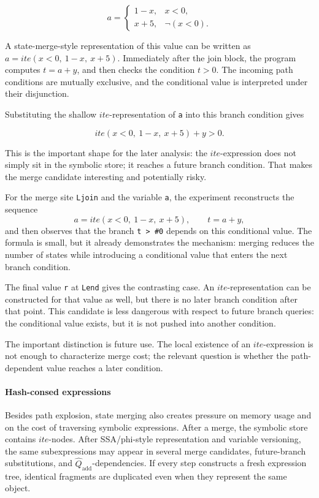 \documentclass[conference]{IEEEtran}
\newcommand{\ite}{\mathit{ite}}
\begin{document}
\[
a =
\begin{cases}
1 - x, & x < 0,\\
x + 5, & \lnot(x < 0).
\end{cases}
\]

A state-merge-style representation of this value can be written as
\(a = \ite(x < 0,\ 1 - x,\ x + 5)\). Immediately after the join block,
the program computes \(t = a + y\), and then checks the condition \(t > 0\).
The incoming path conditions are mutually exclusive, and the conditional value
is interpreted under their disjunction.

Substituting the shallow \(\ite\)-representation of \texttt{a} into this branch
condition gives

\[
\ite(x < 0,\ 1 - x,\ x + 5) + y > 0.
\]

This is the important shape for the later analysis: the \(\ite\)-expression
does not simply sit in the symbolic store; it reaches a future branch condition.
That makes the merge candidate interesting and potentially risky.

For the merge site \texttt{Ljoin} and the variable \texttt{a}, the experiment
reconstructs the sequence
\[
  a = \ite(x < 0,\ 1-x,\ x+5), \qquad t = a + y,
\]
and then observes that the branch \texttt{t > \#0} depends on this conditional
value. The formula is small, but it already demonstrates the mechanism:
merging reduces the number of states while introducing a conditional value that
enters the next branch condition.

The final value \texttt{r} at \texttt{Lend} gives the contrasting case. An
\(\ite\)-representation can be constructed for that value as well, but there is
no later branch condition after that point. This candidate is less dangerous
with respect to future branch queries: the conditional value exists, but it is
not pushed into another condition.

The important distinction is future use. The local existence of an
\(\ite\)-expression is not enough to characterize merge cost; the relevant
question is whether the path-dependent value reaches a later condition.

\paragraph{Hash-consed expressions}
Besides path explosion, state merging also creates pressure on memory usage and
on the cost of traversing symbolic expressions. After a merge, the symbolic
store contains \(\ite\)-nodes. After SSA/phi-style representation and variable
versioning, the same subexpressions may appear in several merge candidates,
future-branch substitutions, and \(\widehat{Q}_{\mathrm{add}}\)-dependencies. If every step constructs
a fresh expression tree, identical fragments are duplicated even when they
represent the same object.
\end{document}
